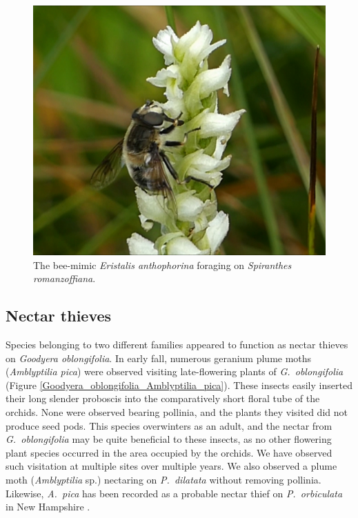 \begin{multicols}{2}
\begin{figure}[H]
\begin{center}
\vspace{2mm}
\includegraphics[width=\textwidth]{img/Spiranthes_romanzoffiana_Eristalis_anthophorina.jpg}
\caption{The bee-mimic \emph{Eristalis anthophorina} foraging on \emph{Spiranthes romanzoffiana}.}
\label{Spiranthes_romanzoffiana_Eristalis_anthophorina}
\end{center}
\end{figure}



\subsection{Nectar thieves}

Species belonging to two different families appeared to function as
nectar thieves on \emph{Goodyera oblongifolia}. In early fall, numerous
geranium plume moths (\emph{Amblyptilia pica}) were observed visiting
late-flowering plants of \emph{G.\ oblongifolia} (Figure \ref{Goodyera_oblongifolia_Amblyptilia_pica}). These
insects easily inserted their long slender proboscis into the
comparatively short floral tube of the orchids. None were observed
bearing pollinia, and the plants they visited did not produce seed pods.
This species overwinters as an adult, and the nectar from \emph{G.\
oblongifolia} may be quite beneficial to these insects, as no other
flowering plant species occurred in the area occupied by the orchids. We
have observed such visitation at multiple sites over multiple years. We
also observed a plume moth (\emph{Amblyptilia} sp.) nectaring on \emph{P.\
dilatata} without removing pollinia. Likewise, \emph{A.\ pica} has been
recorded as a probable nectar thief on \emph{P.\ orbiculata} in New
Hampshire \citep{Bergumetal2018}.


\end{multicols}
